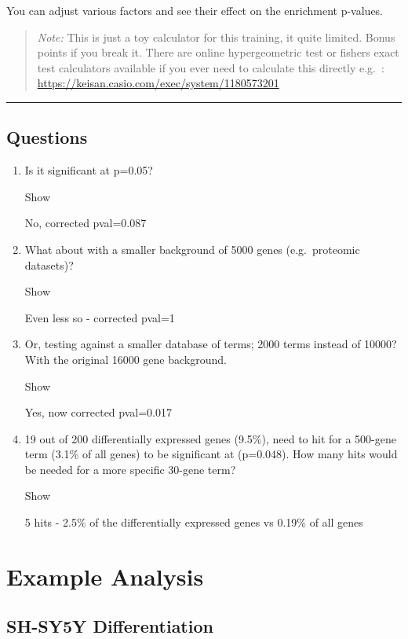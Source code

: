\documentclass[
]{book}
\providecommand{\tightlist}{%
  \setlength{\itemsep}{0pt}\setlength{\parskip}{0pt}}
\begin{document}
You can adjust various factors and see their effect on the enrichment p-values.

\begin{quote}
\emph{Note:} This is just a toy calculator for this training, it quite limited. Bonus points if you break it. There are online hypergeometric test or fishers exact test calculators available if you ever need to calculate this directly e.g.~: \url{https://keisan.casio.com/exec/system/1180573201}
\end{quote}

\begin{center}\rule{0.5\linewidth}{0.5pt}\end{center}

\section{Questions}\label{questions}

\begin{enumerate}
\def\labelenumi{\arabic{enumi}.}
\tightlist
\item
  Is it significant at p=0.05?

  Show

  No, corrected pval=0.087
\item
  What about with a smaller background of 5000 genes (e.g.~proteomic datasets)?

  Show

  Even less so - corrected pval=1
\item
  Or, testing against a smaller database of terms; 2000 terms instead of 10000? With the original 16000 gene background.

  Show

  Yes, now corrected pval=0.017
\item
  19 out of 200 differentially expressed genes (9.5\%), need to hit for a 500-gene term (3.1\% of all genes) to be significant at (p=0.048). How many hits would be needed for a more specific 30-gene term?

  Show

  5 hits - 2.5\% of the differentially expressed genes vs 0.19\% of all genes
\end{enumerate}

\chapter{Example Analysis}\label{example-analysis}

\section{SH-SY5Y Differentiation}\label{sh-sy5y-differentiation}
\end{document}
